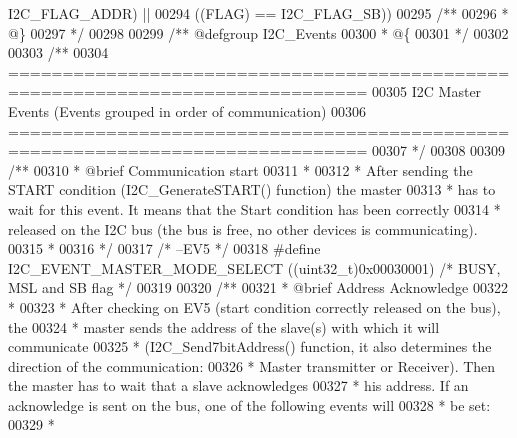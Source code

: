 \begin{DoxyCode}
      I2C_FLAG_ADDR\textcolor{preprocessor}{)} \textcolor{preprocessor}{||}
00294                                \textcolor{preprocessor}{(}\textcolor{preprocessor}{(}\textcolor{preprocessor}{FLAG}\textcolor{preprocessor}{)} \textcolor{preprocessor}{==} I2C_FLAG_SB\textcolor{preprocessor}{)}\textcolor{preprocessor}{)}
00295 \textcolor{comment}{/**}
00296 \textcolor{comment}{  * @\}}
00297 \textcolor{comment}{  */}
00298 
00299 \textcolor{comment}{/** @defgroup I2C\_Events }
00300 \textcolor{comment}{  * @\{}
00301 \textcolor{comment}{  */}
00302 
00303 \textcolor{comment}{/**}
00304 \textcolor{comment}{ ===============================================================================}
00305 \textcolor{comment}{               I2C Master Events (Events grouped in order of communication)}
00306 \textcolor{comment}{ ===============================================================================}
00307 \textcolor{comment}{ */}
00308 
00309 \textcolor{comment}{/** }
00310 \textcolor{comment}{  * @brief  Communication start}
00311 \textcolor{comment}{  * }
00312 \textcolor{comment}{  * After sending the START condition (I2C\_GenerateSTART() function) the master }
00313 \textcolor{comment}{  * has to wait for this event. It means that the Start condition has been correctly }
00314 \textcolor{comment}{  * released on the I2C bus (the bus is free, no other devices is communicating).}
00315 \textcolor{comment}{  * }
00316 \textcolor{comment}{  */}
00317 \textcolor{comment}{/* --EV5 */}
00318 \textcolor{preprocessor}{#}\textcolor{preprocessor}{define}  \textcolor{preprocessor}{I2C\_EVENT\_MASTER\_MODE\_SELECT}                      \textcolor{preprocessor}{(}\textcolor{preprocessor}{(}\textcolor{preprocessor}{uint32\_t}\textcolor{preprocessor}{)}0x00030001\textcolor{preprocessor}{)}  \textcolor{comment}{/* BUSY, MSL and SB
       flag */}
00319 
00320 \textcolor{comment}{/** }
00321 \textcolor{comment}{  * @brief  Address Acknowledge}
00322 \textcolor{comment}{  * }
00323 \textcolor{comment}{  * After checking on EV5 (start condition correctly released on the bus), the }
00324 \textcolor{comment}{  * master sends the address of the slave(s) with which it will communicate }
00325 \textcolor{comment}{  * (I2C\_Send7bitAddress() function, it also determines the direction of the communication: }
00326 \textcolor{comment}{  * Master transmitter or Receiver). Then the master has to wait that a slave acknowledges }
00327 \textcolor{comment}{  * his address. If an acknowledge is sent on the bus, one of the following events will }
00328 \textcolor{comment}{  * be set:}
00329 \textcolor{comment}{  * }

\end{DoxyCode}

